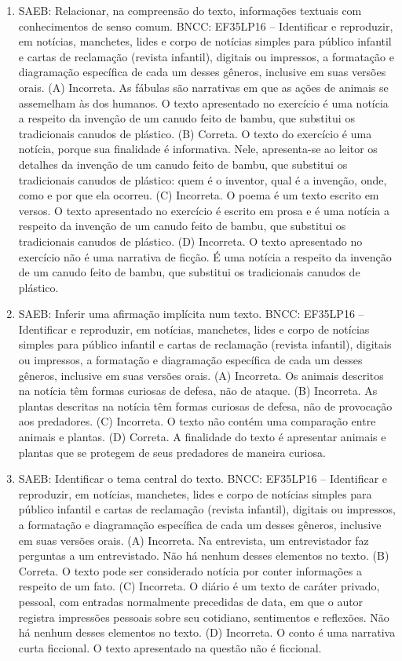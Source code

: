 \begin{enumerate}
\item
SAEB: Relacionar, na compreensão do texto, informações textuais com
conhecimentos de senso comum.
BNCC: EF35LP16 -- Identificar e reproduzir, em notícias, manchetes, lides
e corpo de notícias simples para público infantil e cartas de reclamação
(revista infantil), digitais ou impressos, a formatação e diagramação
específica de cada um desses gêneros, inclusive em suas versões orais.
(A) Incorreta. As fábulas são narrativas em que as ações de animais se 
assemelham às dos humanos. O texto apresentado no exercício é uma notícia 
a respeito da invenção de um canudo feito de bambu, que substitui os 
tradicionais canudos de plástico.  
(B) Correta. O texto do exercício é uma notícia, porque sua finalidade é
informativa. Nele, apresenta-se ao leitor os detalhes da invenção de um 
canudo feito de bambu, que substitui os tradicionais canudos de plástico:
quem é o inventor, qual é a invenção, onde, como e por que ela ocorreu.
(C) Incorreta. O poema é um texto escrito em versos. O texto apresentado 
no exercício é escrito em prosa e é uma notícia a respeito da invenção de
um canudo feito de bambu, que substitui os tradicionais canudos de 
plástico.   
(D) Incorreta. O texto apresentado no exercício não é uma narrativa de 
ficção. É uma notícia a respeito da invenção de um canudo feito de bambu,
que substitui os tradicionais canudos de plástico.

\item
SAEB: Inferir uma afirmação implícita num texto.
BNCC: EF35LP16 -- Identificar e reproduzir, em notícias, manchetes, lides
e corpo de notícias simples para público infantil e cartas de reclamação
(revista infantil), digitais ou impressos, a formatação e diagramação
específica de cada um desses gêneros, inclusive em suas versões orais.
(A) Incorreta. Os animais descritos na notícia têm formas curiosas de 
defesa, não de ataque. 
(B) Incorreta. As plantas descritas na notícia têm formas curiosas de 
defesa, não de provocação aos predadores. 
(C) Incorreta. O texto não contém uma comparação entre animais e plantas.  
(D) Correta. A finalidade do texto é apresentar animais e plantas que se 
protegem de seus predadores de maneira curiosa.

\item
SAEB: Identificar o tema central do texto.
BNCC: EF35LP16 -- Identificar e reproduzir, em notícias, manchetes, lides
e corpo de notícias simples para público infantil e cartas de reclamação
(revista infantil), digitais ou impressos, a formatação e diagramação
específica de cada um desses gêneros, inclusive em suas versões orais.
(A) Incorreta. Na entrevista, um entrevistador faz perguntas a um 
entrevistado. Não há nenhum desses elementos no texto. 
(B) Correta. O texto pode ser considerado notícia por conter informações a 
respeito de um fato.
(C) Incorreta. O diário é um texto de caráter privado, pessoal, com entradas
normalmente precedidas de data, em que o autor registra impressões pessoais
sobre seu cotidiano, sentimentos e reflexões. Não há nenhum desses
elementos no texto. 
(D) Incorreta. O conto é uma narrativa curta ficcional. O texto apresentado 
na questão não é ficcional.
\end{enumerate}

